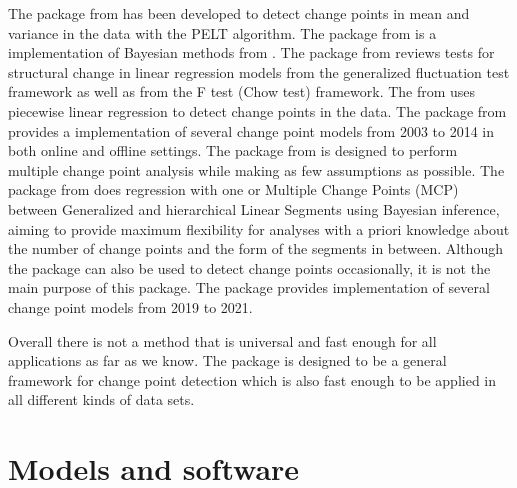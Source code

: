 \documentclass[article]{jss}
\begin{document}
The  package  from \cite{killick2014changepoint}
has been developed to detect change points in mean and variance in the data with
the PELT algorithm.
The  package  from \citep{erdman2008bcp} is a implementation
of Bayesian methods from \cite{barry1993bayesian}.
The  package  from \cite{zeileis2002strucchange}
reviews tests for structural change in linear regression models from the
generalized fluctuation test framework as well as from the F test (Chow test)
framework.
The   from \cite{muggeo2008segmented} uses piecewise
linear regression to detect change points in the data.
The  package  from \citep{ross2015parametric} provides a
implementation of several change point models from 2003 to 2014 in both online
and offline settings.
The  package  from \citep{james2013ecp} is designed to
perform multiple change point analysis while making as few assumptions as possible.
The  package  from \citep{lindelov2020mcp} does regression
with one or Multiple Change Points (MCP) between Generalized and hierarchical
Linear Segments using Bayesian inference, aiming to provide maximum
flexibility for analyses with a priori knowledge about the number of change
points and the form of the segments in between.
Although the  package  can also be used to detect change
points occasionally, it is not the main purpose of this package.
The  package  \citep{changepoints2022} provides
implementation of several change point models from 2019 to 2021.

Overall there is not a method that is universal and fast enough for all
applications as far as we know. The  package is designed to be a
general framework for change point detection which is also fast enough to be
applied in all different kinds of data sets.


\section{Models and software} \label{sec:models}
\end{document}
